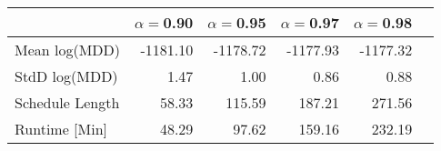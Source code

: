 \begin{tabular} {lrrrrr} 
 \hline \hline 
&$\alpha = $0.90&$\alpha = $0.95&$\alpha = $0.97&$\alpha = $0.98\\ 
 \hline 
Mean log(MDD)&-1181.10&-1178.72&-1177.93&-1177.32\\ 
StdD log(MDD)&1.47&1.00&0.86&0.88\\ 
Schedule Length&58.33&115.59&187.21&271.56\\ 
Runtime [Min]&48.29&97.62&159.16&232.19\\ 
\hline 
\end{tabular}